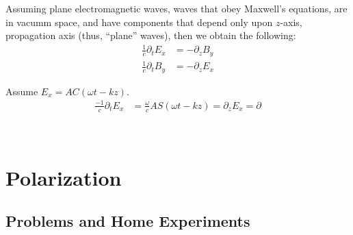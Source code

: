 \documentclass[twoside,10pt]{amsart}
\begin{document}
Assuming plane electromagnetic waves, waves that obey Maxwell's equations, are in vacumm space, and have components that depend only upon $z$-axis, propagation axis (thus, ``plane'' waves), then we obtain the following:
\[
\begin{aligned}
  \frac{1}{c} \partial_t E_x & = - \partial_z B_y \\
  \frac{1}{c} \partial_t B_y & = -\partial_z E_x
\end{aligned}
\]

Assume $E_x = AC(\omega t- kz)$.  
\[
\begin{aligned}
  \frac{-1}{c} \partial_t E_x & = \frac{\omega}{c} A S(\omega t - kz) = \partial_z E_x = \partial
\end{aligned}
\]

\quad \\ 



\section{Polarization}

\subsection*{Problems and Home Experiments}
\end{document}

